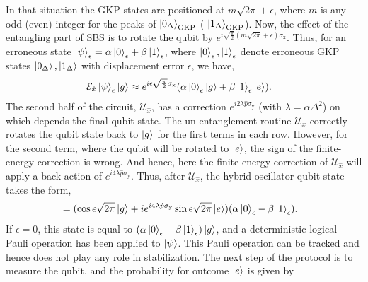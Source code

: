 \documentclass[aps,prx,showpacs,notitlepage,twocolumn,superscriptaddress,nofootinbib,preprintnumbers,floatfix,10pt, longbibliography]{revtex4-2}
\begin{document}
In that situation the GKP states are positioned at $m\sqrt{2\pi}+\epsilon$, where $m$ is any odd (even) integer for the peaks of $\ket{0_\Delta}_\mathrm{GKP}$ ( $\ket{1_\Delta}_\mathrm{GKP}$). Now, the effect of the entangling part of SBS is to rotate the qubit by $e^{i\sqrt{\frac{\pi}{2}}(m\sqrt{2\pi}+\epsilon)\sigma_\mathrm{x}}$. Thus, for an erroneous state $\ket{\psi}_\epsilon=\alpha\ket{0}_\epsilon+\beta\ket{1}_\epsilon$, where $\ket{0}_\epsilon,\ket{1}_\epsilon$ denote erroneous GKP states $\ket{0_\Delta},\ket{1_\Delta}$ with displacement error $\epsilon$, we have,
\begin{align}
  \mathcal{E}_{\hat x} \ket{\psi}_\epsilon\ket{g}&\approx e^{i\epsilon\sqrt{\frac{\pi}{2}}\sigma_\mathrm{x}}(\alpha\ket{0}_\epsilon\ket{g}+\beta\ket{1}_\epsilon\ket{e}).
\end{align}
The second half of the circuit, $\mathcal{U}_{\hat x}$, has a correction $e^{i2\lambda\hat p\sigma_\mathrm{y}}$ (with $\lambda=\alpha\Delta^2$) on which depends the final qubit state. The un-entanglement routine $\mathcal{U}_{\hat x}$ correctly rotates the qubit state back to $\ket{g}$ for the first terms in each row. However, for the second term, where the qubit will be rotated to $\ket{e}$, the sign of the finite-energy correction is wrong. And hence, here the finite energy correction of $\mathcal{U}_{\hat x}$ will apply a back action of $e^{i4\lambda\hat p\sigma_\mathrm{y}}$. Thus, after $\mathcal{U}_{\hat x}$, the hybrid oscillator-qubit state takes the form,
\begin{align}    
&=(\cos{\epsilon\sqrt{2\pi}}\ket{g}+ie^{i4\lambda\hat p\sigma_\mathrm{y}}\sin{\epsilon\sqrt{2\pi}}\ket{e})(\alpha\ket{0}_\epsilon-\beta\ket{1}_\epsilon).
\end{align}
If $\epsilon=0$, this state is equal to $(\alpha\ket{0}_\epsilon-\beta\ket{1}_\epsilon)\ket{g}$, and a deterministic logical Pauli operation has been applied to $\ket{\psi}$. This Pauli operation can be tracked and hence does not play any role in stabilization. The next step of the protocol is to measure the qubit, and the probability for outcome $\ket{e}$ is given by
\end{document}
